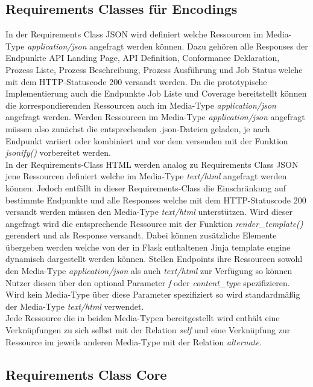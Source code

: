 \subsection{Requirements Classes für Encodings}
In der Requirements Class JSON wird definiert welche Ressourcen im Media-Type \textit{application/json} angefragt werden können. Dazu gehören alle Responses der 
Endpunkte API Landing Page, API Definition, Conformance Deklaration, Prozess Liste, Prozess Beschreibung, Prozess Ausführung und Job Status welche mit dem 
HTTP-Statuscode 200 versandt werden. Da die prototypische Implementierung auch die Endpunkte Job Liste und Coverage bereitstellt können die korrespondierenden
Ressourcen auch im Media-Type \textit{application/json} angefragt werden.
Werden Ressourcen im Media-Type \textit{application/json} angefragt müssen also zunächst die entsprechenden .json-Dateien geladen, je nach Endpunkt variiert oder 
kombiniert und vor dem versenden mit der Funktion \textit{jsonify()} vorbereitet werden. \\
In der Requirements-Class HTML werden analog zu Requirements Class JSON jene Ressourcen definiert welche im Media-Type \textit{text/html} angefragt werden können. Jedoch
entfällt in dieser Requirements-Class die Einschränkung auf bestimmte Endpunkte und alle Responses welche mit dem HTTP-Statuscode 200 versandt werden müssen den 
Media-Type \textit{text/html} unterstützen. Wird dieser angefragt wird die entsprechende Ressource mit der Funktion \textit{render\_template()} gerendert und als Response versandt.
Dabei können zusätzliche Elemente übergeben werden welche von der in Flask enthaltenen Jinja template engine dynamisch dargestellt werden können.
Stellen Endpoints ihre Ressourcen sowohl den Media-Type \textit{application/json} als auch \textit{text/html} zur Verfügung so können Nutzer diesen über den optional Parameter
\textit{f} oder \textit{content\_type} spezifizieren. Wird kein Media-Type über diese Parameter spezifiziert so wird standardmäßig der Media-Type \textit{text/html} verwendet. \\
Jede Ressource die in beiden Media-Typen bereitgestellt wird enthält eine Verknüpfungen zu sich selbst mit der Relation \textit{self} und eine Verknüpfung 
zur Ressource im jeweils anderen Media-Type mit der Relation \textit{alternate}.

\subsection{Requirements Class Core}
